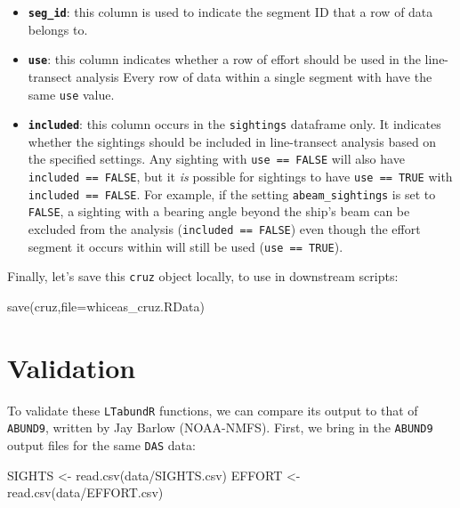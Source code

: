 \documentclass[
]{book}
\newenvironment{Shaded}{\begin{snugshade}}{\end{snugshade}}
\newcommand{\AttributeTok}[1]{\textcolor[rgb]{0.77,0.63,0.00}{#1}}
\newcommand{\FunctionTok}[1]{\textcolor[rgb]{0.00,0.00,0.00}{#1}}
\newcommand{\NormalTok}[1]{#1}
\newcommand{\OtherTok}[1]{\textcolor[rgb]{0.56,0.35,0.01}{#1}}
\newcommand{\StringTok}[1]{\textcolor[rgb]{0.31,0.60,0.02}{#1}}
\begin{document}
\begin{itemize}
\item
  \textbf{\texttt{seg\_id}}: this column is used to indicate the segment ID that a row of data belongs to.
\item
  \textbf{\texttt{use}}: this column indicates whether a row of effort should be used in the line-transect analysis Every row of data within a single segment with have the same \texttt{use} value.
\item
  \textbf{\texttt{included}}: this column occurs in the \texttt{sightings} dataframe only. It indicates whether the sightings should be included in line-transect analysis based on the specified settings. Any sighting with \texttt{use\ ==\ FALSE} will also have \texttt{included\ ==\ FALSE}, but it \emph{is} possible for sightings to have \texttt{use\ ==\ TRUE} with \texttt{included\ ==\ FALSE}. For example, if the setting \texttt{abeam\_sightings} is set to \texttt{FALSE}, a sighting with a bearing angle beyond the ship's beam can be excluded from the analysis (\texttt{included\ ==\ FALSE}) even though the effort segment it occurs within will still be used (\texttt{use\ ==\ TRUE}).
\end{itemize}

Finally, let's save this \texttt{cruz} object locally, to use in downstream scripts:

\begin{Shaded}
\begin{Highlighting}[]
\FunctionTok{save}\NormalTok{(cruz,}\AttributeTok{file=}\StringTok{\textquotesingle{}whiceas\_cruz.RData\textquotesingle{}}\NormalTok{)}
\end{Highlighting}
\end{Shaded}

\hypertarget{validation}{%
\section*{Validation}\label{validation}}

To validate these \texttt{LTabundR} functions, we can compare its output to that of \texttt{ABUND9}, written by Jay Barlow (NOAA-NMFS). First, we bring in the \texttt{ABUND9} output files for the same \texttt{DAS} data:

\begin{Shaded}
\begin{Highlighting}[]
\NormalTok{SIGHTS }\OtherTok{\textless{}{-}} \FunctionTok{read.csv}\NormalTok{(}\StringTok{\textquotesingle{}data/SIGHTS.csv\textquotesingle{}}\NormalTok{)}
\NormalTok{EFFORT }\OtherTok{\textless{}{-}} \FunctionTok{read.csv}\NormalTok{(}\StringTok{\textquotesingle{}data/EFFORT.csv\textquotesingle{}}\NormalTok{)}
\end{Highlighting}
\end{Shaded}
\end{document}
